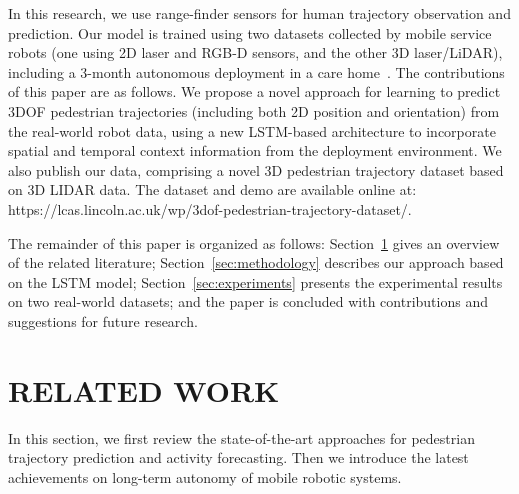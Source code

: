\documentclass[letterpaper, 10 pt, conference]{ieeeconf}  %
\begin{document}
In this research, we use range-finder sensors for human trajectory observation and prediction. Our model is trained using two datasets collected by mobile service robots (one using 2D laser and RGB-D sensors, and the other 3D laser/LiDAR), including a 3-month autonomous deployment in a care home~\cite{Hawes2016}.
The contributions of this paper are as follows.
We propose a novel approach for learning to predict 3DOF pedestrian trajectories (including both 2D position and orientation) from the real-world robot data, using a new LSTM-based architecture to incorporate spatial and temporal context information from the deployment environment.
We also publish our data, comprising a novel 3D pedestrian trajectory dataset based on 3D LIDAR data.
The dataset and demo are available online at: https://lcas.lincoln.ac.uk/wp/3dof-pedestrian-trajectory-dataset/.

The remainder of this paper is organized as follows:
Section~\ref{sec:related_work} gives an overview of the related literature;
Section~\ref{sec:methodology} describes our approach based on the LSTM model;
Section~\ref{sec:experiments} presents the experimental results on two real-world datasets;
and the paper is concluded with contributions and suggestions for future research.


\section{RELATED WORK}
\label{sec:related_work}
In this section, we first review the state-of-the-art approaches for pedestrian trajectory prediction and activity forecasting. Then we introduce the latest achievements on long-term autonomy of mobile robotic systems.
\end{document}
